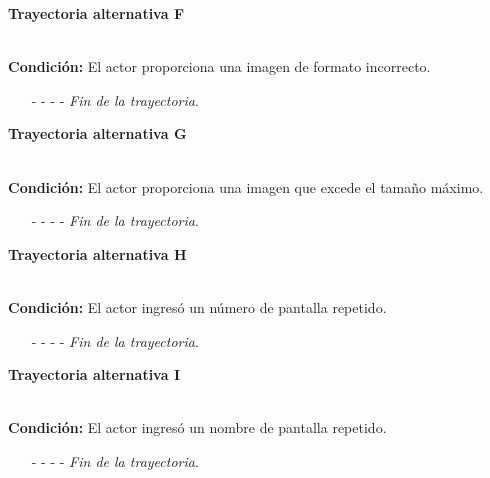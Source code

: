 \hypertarget{CU11-1:TAF}{\textbf{Trayectoria alternativa F}}\\
\noindent \textbf{Condición:} El actor proporciona una imagen de formato incorrecto.
\begin{enumerate}
	\UCpaso[\UCsist] Muestra el mensaje  señalando el campo que presenta el error en la pantalla .
	\UCpaso Regresa al paso \ref{CU11.1-P4} de la trayectoria principal.
	\item[- -] - - {\em {Fin de la trayectoria}}.
\end{enumerate}
\hypertarget{CU11-1:TAG}{\textbf{Trayectoria alternativa G}}\\
\noindent \textbf{Condición:} El actor proporciona una imagen que excede el tamaño máximo.
\begin{enumerate}
	\UCpaso[\UCsist] Muestra el mensaje  señalando el campo que presenta el error en la pantalla .
	\UCpaso Regresa al paso \ref{CU11.1-P4} de la trayectoria principal.
	\item[- -] - - {\em {Fin de la trayectoria}}.
\end{enumerate}

\hypertarget{CU11-1:TAH}{\textbf{Trayectoria alternativa H}}\\
\noindent \textbf{Condición:} El actor ingresó un número de pantalla repetido.
\begin{enumerate}
	\UCpaso[\UCsist] Muestra el mensaje  señalando el campo que presenta la duplicidad en la pantalla .
	\UCpaso Regresa al paso \ref{CU11.1-P3} de la trayectoria principal.
	\item[- -] - - {\em {Fin de la trayectoria}}.
\end{enumerate}
\hypertarget{CU11-1:TAI<}{\textbf{Trayectoria alternativa I}}\\
\noindent \textbf{Condición:} El actor ingresó un nombre de pantalla repetido.
\begin{enumerate}
	\UCpaso[\UCsist] Muestra el mensaje  señalando el campo que presenta la duplicidad en la pantalla .
	\UCpaso Regresa al paso \ref{CU11.1-P3} de la trayectoria principal.
	\item[- -] - - {\em {Fin de la trayectoria}}.
\end{enumerate}
